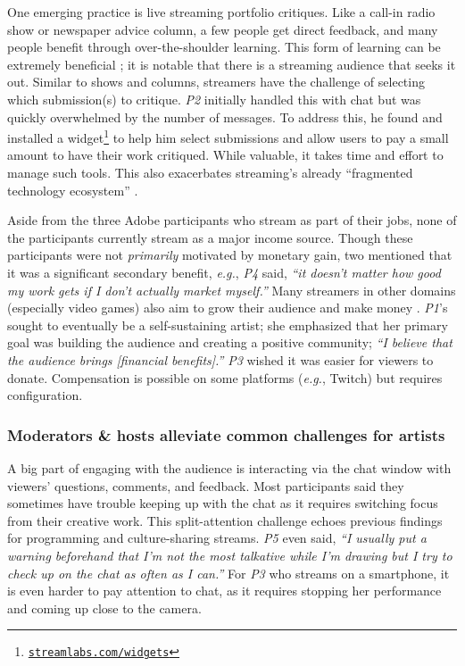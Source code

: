 One emerging practice is live streaming portfolio critiques. Like a call-in radio show or newspaper advice column, a few people get direct feedback, and many people benefit through over-the-shoulder learning. This form of learning can be extremely beneficial \cite{Lopez2010}; it is notable that there is a streaming audience that seeks it out. Similar to shows and columns, streamers have the challenge of selecting which submission(s) to critique. \textit{P2} initially handled this with chat but was quickly overwhelmed by the number of messages. To address this, he found and installed a widget\footnote{\href{https://streamlabs.com/widgets}{\nolinkurl{streamlabs.com/widgets}}} to help him select submissions and allow users to pay a small amount to have their work critiqued. While valuable, it takes time and effort to manage such tools. This also exacerbates streaming's already ``fragmented technology ecosystem'' \cite{Lu2019}.

Aside from the three Adobe participants who stream as part of their jobs, none of the participants currently stream as a major income source. Though these participants were not \textit{primarily} motivated by monetary gain, two mentioned that it was a significant secondary benefit, \textit{e.g.}, \textit{P4} said, \textit{``it doesn't matter how good my work gets if I don't actually market myself.''} Many streamers in other domains (especially video games) also aim to grow their audience and make money \cite{Pellicone2017}. \textit{P1}'s sought to eventually be a self-sustaining artist; she emphasized that her primary goal was building the audience and creating a positive community; \textit{``I believe that the audience brings [financial benefits].''} \textit{P3} wished it was easier for viewers to donate. Compensation is possible on some platforms (\textit{e.g.}, Twitch) but requires configuration.

\subsubsection{Moderators \& hosts alleviate common challenges for artists}
A big part of engaging with the audience is interacting via the chat window with viewers' questions, comments, and feedback. 
Most participants said they sometimes have trouble keeping up with the chat as it requires switching focus from their creative work. This split-attention challenge echoes previous findings for programming \cite{Faas2018} and culture-sharing \cite{Lu2019} streams.
\textit{P5} even said, \textit{``I usually put a warning beforehand that I'm not the most talkative while I'm drawing but I try to check up on the chat as often as I can.''} For \textit{P3} who streams on  a smartphone, it is even harder to pay attention to chat, as it requires stopping her performance and coming up close to the camera.

